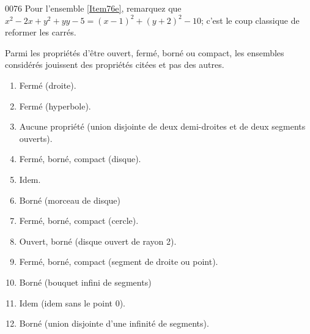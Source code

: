 \begin{corrige}{0076}
Pour l'ensemble \ref{Item76e}, remarquez que $x^2-2x+y^2+yy-5=(x-1)^2+(y+2)^2-10$; c'est le coup classique de reformer les carrés.

Parmi les propriétés d'être ouvert, fermé, borné ou compact, les ensembles considérés jouissent des propriétés citées et pas des
autres.
\begin{enumerate}
\item Fermé (droite).
\item Fermé (hyperbole).
\item Aucune propriété (union disjointe de deux demi-droites et de deux segments ouverts).
\item Fermé, borné, compact (disque).
\item Idem.
\item Borné (morceau de disque)
\item Fermé, borné, compact (cercle).
\item Ouvert, borné (disque ouvert de rayon 2).
\item Fermé, borné, compact (segment de droite ou point).
\item Borné (bouquet infini de segments)
\item Idem (idem sans le point $0$).
\item Borné (union disjointe d'une infinité de segments).
\end{enumerate}


\end{corrige}
